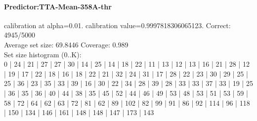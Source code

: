 \documentclass[parskip=half]{scrartcl}
\begin{document}
\paragraph{Predictor:TTA-Mean-358A-thr} calibration at alpha=0.01. calibration value=0.9997818306065123. Correct: 4945/5000\\
Average set size: 69.8446   Coverage: 0.989\\
Set size histogram (0..K):\\
0 | 24 | 21 | 27 | 27 | 30 | 14 | 25 | 14 | 18 | 22 | 11 | 13 | 12 | 13 | 16 | 21 | 28 | 12 | 19 | 17 | 22 | 18 | 16 | 18 | 22 | 21 | 32 | 24 | 31 | 17 | 28 | 22 | 23 | 30 | 29 | 25 | 25 | 36 | 23 | 35 | 33 | 39 | 16 | 30 | 22 | 34 | 28 | 39 | 28 | 33 | 33 | 37 | 33 | 19 | 25 | 36 | 35 | 36 | 40 | 44 | 38 | 35 | 45 | 52 | 44 | 46 | 49 | 53 | 48 | 53 | 51 | 53 | 59 | 58 | 72 | 64 | 62 | 63 | 72 | 81 | 62 | 89 | 102 | 82 | 99 | 91 | 86 | 92 | 114 | 96 | 118 | 150 | 134 | 146 | 161 | 148 | 148 | 147 | 173 | 143\\
\end{document}
